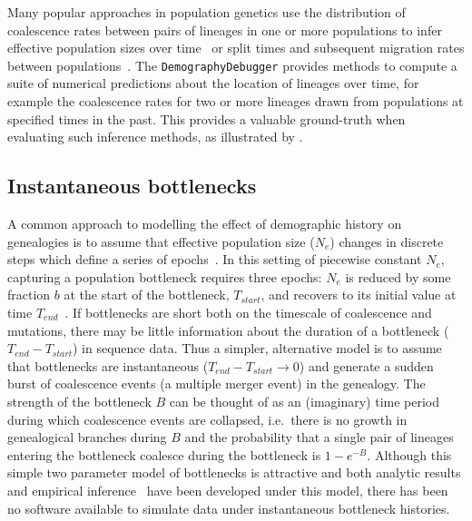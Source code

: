 \documentclass{article}
\begin{document}
Many popular approaches in population genetics use the distribution of
coalescence rates between pairs of lineages in one or more populations to infer
effective population sizes over
time~\citep{li2011inference,sheehan2013estimating,schiffels2014inferring} or
split times and subsequent migration rates between
populations~\citep{wang2020tracking}. The \texttt{DemographyDebugger} provides
methods to compute a suite of numerical predictions about the location of
lineages over time, for example the coalescence rates for two or more lineages
drawn from populations at specified times in the past. This provides a valuable
ground-truth when evaluating such inference methods, as illustrated by
\cite{adrion2020community}.

\subsection*{Instantaneous bottlenecks}

A common approach to modelling the effect of demographic history on genealogies
is to assume that effective population size ($N_e$) changes in discrete steps
which define a series of epochs~\citep{griffiths1994sampling, marth2004allele,
keightley2007joint,li2011inference}. In this setting of piecewise constant
$N_e$, capturing a population bottleneck requires three epochs: $N_e$ is
reduced by some fraction $b$ at the start of the bottleneck, $T_{start}$, and
recovers to its initial value at time $T_{end}$~\citep{marth2004allele}. If
bottlenecks are short both on the timescale of coalescence and mutations,
there may be little information about the duration of a bottleneck
($T_{end}-T_{start}$) in sequence data. Thus a simpler, alternative model is to
assume that bottlenecks are instantaneous ($T_{end}-T_{start} \rightarrow 0$)
and generate a sudden burst of coalescence events (a multiple merger event) in
the genealogy. The strength of the bottleneck $B$ can be thought of as an
(imaginary) time period during which coalescence events are collapsed,
i.e.\ there is no growth in genealogical branches during $B$ and the probability that a
single pair of lineages entering the bottleneck coalesce during the bottleneck
is $1-e^{-B}$. Although this simple two parameter model of bottlenecks is
attractive and both analytic results and empirical
inference~\citep{griffiths1994sampling, galtier2000detecting,
bunnefeld2015inferring} have been developed under this model, there has
been no software available to simulate data under instantaneous
bottleneck histories.
\end{document}
